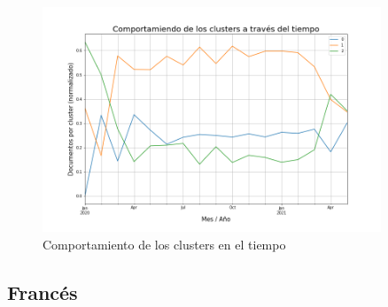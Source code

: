 \begin{figure}
    \centering
    \includegraphics[width=0.9\textwidth]{results/TopicDetection/es/cluster_over_time.png}
    \caption{Comportamiento de los clusters en el tiempo}
    \label{fig:es_time}
\end{figure}



\subsection{Francés}